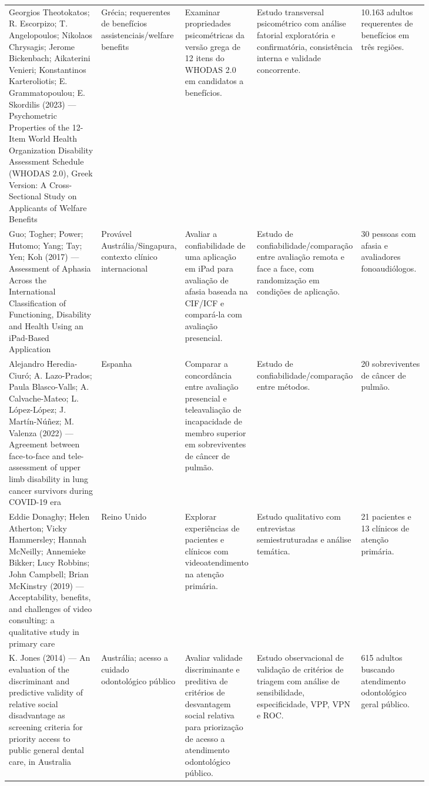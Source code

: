 \documentclass[12pt,a4paper]{article}
\begin{document}
\begin{landscape}
\begin{longtable}{p{0.22\linewidth}p{0.11\linewidth}p{0.17\linewidth}p{0.17\linewidth}p{0.16\linewidth}}
Georgios Theotokatos; R. Escorpizo; T. Angelopoulos; Nikolaos Chrysagis; Jerome Bickenbach; Aikaterini Venieri; Konstantinos Karteroliotis; E. Grammatopoulou; E. Skordilis (2023) — Psychometric Properties of the 12-Item World Health Organization Disability Assessment Schedule (WHODAS 2.0), Greek Version: A Cross-Sectional Study on Applicants of Welfare Benefits & Grécia; requerentes de benefícios assistenciais/welfare benefits & Examinar propriedades psicométricas da versão grega de 12 itens do WHODAS 2.0 em candidatos a benefícios. & Estudo transversal psicométrico com análise fatorial exploratória e confirmatória, consistência interna e validade concorrente. & 10.163 adultos requerentes de benefícios em três regiões.\\
Guo; Togher; Power; Hutomo; Yang; Tay; Yen; Koh (2017) — Assessment of Aphasia Across the International Classification of Functioning, Disability and Health Using an iPad-Based Application & Provável Austrália/Singapura, contexto clínico internacional & Avaliar a confiabilidade de uma aplicação em iPad para avaliação de afasia baseada na CIF/ICF e compará-la com avaliação presencial. & Estudo de confiabilidade/comparação entre avaliação remota e face a face, com randomização em condições de aplicação. & 30 pessoas com afasia e avaliadores fonoaudiólogos.\\
Alejandro Heredia-Ciuró; A. Lazo-Prados; Paula Blasco-Valls; A. Calvache-Mateo; L. López-López; J. Martín-Núñez; M. Valenza (2022) — Agreement between face-to-face and tele-assessment of upper limb disability in lung cancer survivors during COVID-19 era & Espanha & Comparar a concordância entre avaliação presencial e teleavaliação de incapacidade de membro superior em sobreviventes de câncer de pulmão. & Estudo de confiabilidade/comparação entre métodos. & 20 sobreviventes de câncer de pulmão.\\
Eddie Donaghy; Helen Atherton; Vicky Hammersley; Hannah McNeilly; Annemieke Bikker; Lucy Robbins; John Campbell; Brian McKinstry (2019) — Acceptability, benefits, and challenges of video consulting: a qualitative study in primary care & Reino Unido & Explorar experiências de pacientes e clínicos com videoatendimento na atenção primária. & Estudo qualitativo com entrevistas semiestruturadas e análise temática. & 21 pacientes e 13 clínicos de atenção primária.\\
K. Jones (2014) — An evaluation of the discriminant and predictive validity of relative social disadvantage as screening criteria for priority access to public general dental care, in Australia & Austrália; acesso a cuidado odontológico público & Avaliar validade discriminante e preditiva de critérios de desvantagem social relativa para priorização de acesso a atendimento odontológico público. & Estudo observacional de validação de critérios de triagem com análise de sensibilidade, especificidade, VPP, VPN e ROC. & 615 adultos buscando atendimento odontológico geral público.\\
\end{longtable}
\normalsize
\end{landscape}
\end{document}
